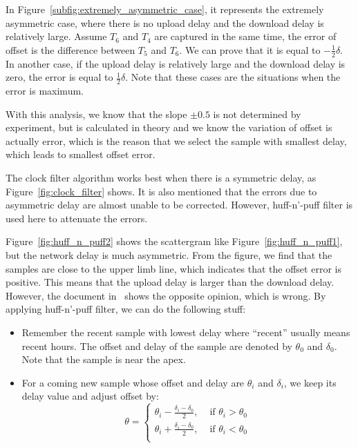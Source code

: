 In Figure~\ref{subfig:extremely_asymmetric_case}, it represents the extremely
asymmetric case, where there is no upload delay and the download delay is
relatively large. Assume $T_6$ and $T_4$ are captured in the same time, the
error of offset is the difference between $T_5$ and $T_6$. We can prove that it
is equal to $-\frac{1}{2}\delta$. In another case, if the upload delay is
relatively large and the download delay is zero, the error is equal to
$\frac{1}{2}\delta$. Note that these cases are the situations when the error is
maximum.

With this analysis, we know that the slope $\pm0.5$ is not determined by
experiment, but is calculated in theory and we know the variation of offset is
actually error, which is the reason that we select the sample with smallest
delay, which leads to smallest offset error.

The clock filter algorithm works best when there is a symmetric delay, as
Figure~\ref{fig:clock_filter} shows. It is also mentioned that the errors due
to asymmetric delay are almost unable to be corrected. However, huff-n'-puff
filter is used here to attenuate the errors.

Figure~\ref{fig:huff_n_puff2} shows the scattergram like
Figure~\ref{fig:huff_n_puff1}, but the network delay is much asymmetric. From
the figure, we find that the samples are close to the upper limb line, which
indicates that the offset error is positive. This means that the upload delay
is larger than the download delay. However, the document in~\cite{huff_n_puff}
shows the opposite opinion, which is wrong. By applying huff-n'-puff filter,
we can do the following stuff:
\begin{itemize}
    \item 
        Remember the recent sample with lowest delay where ``recent'' usually
        means recent hours. The offset and delay of the sample are denoted by 
        $\theta_0$ and $\delta_0$. Note that the sample is near the apex.
    \item 
        For a coming new sample whose offset and delay are $\theta_i$ and
        $\delta_i$, we keep its delay value and adjust offset by:
        \begin{equation}
            \theta = 
            \begin{cases}
                \displaystyle
                \theta_i - \frac{\delta_i - \delta_0}{2}, &\text{ if }\theta_i
                > \theta_0\\
                \displaystyle
                \theta_i + \frac{\delta_i - \delta_0}{2}, &\text{ if }\theta_i
                < \theta_0\\
            \end{cases}
            \label{eq:huff_n_puff}
        \end{equation}
\end{itemize}


